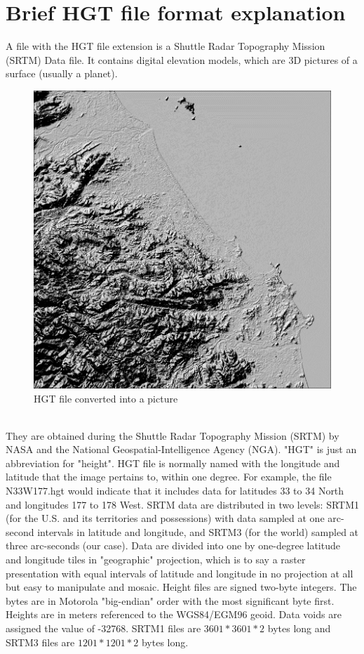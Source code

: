 \documentclass[peerreview]{IEEEtran}
\begin{document}
\section{Brief HGT file format explanation}
A file with the HGT file extension is a Shuttle Radar Topography Mission (SRTM) Data file. It contains digital elevation models, which are 3D pictures of a surface (usually a planet).
\begin{figure}[!ht]
\centering
\includegraphics[width=1\columnwidth]{hgtPicture} 
\caption{HGT file converted into a picture}
\label{fig_hgtPicture}
\end{figure}
\\They are obtained during the Shuttle Radar Topography Mission (SRTM) by NASA and the National Geospatial-Intelligence Agency (NGA). "HGT" is just an abbreviation for "height". HGT file is normally named with the longitude and latitude that the image pertains to, within one degree. For example, the file N33W177.hgt would indicate that it includes data for latitudes 33 to 34 North and longitudes 177 to 178 West. SRTM data are distributed in two levels: SRTM1 (for the U.S. and its territories and possessions) with data sampled at one arc-second intervals in latitude and longitude, and SRTM3 (for the world) sampled at three arc-seconds (our case). Data are divided into one by one-degree latitude and longitude tiles in "geographic" projection, which is to say a raster presentation with equal intervals of latitude and longitude in no projection at all but easy to manipulate and mosaic. Height files are signed two-byte integers. The bytes are in Motorola "big-endian" order with the most significant byte first. Heights are in meters referenced to the WGS84/EGM96 geoid. Data voids are assigned the value of -32768. SRTM1 files are $3601*3601*2$ bytes long and SRTM3 files are $1201*1201*2$ bytes long.
\end{document}
